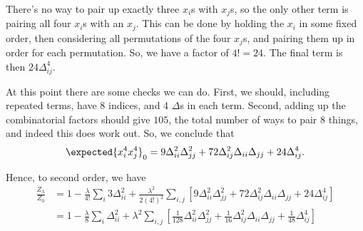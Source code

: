 \documentclass[fleqn]{NotesClass}
\begin{document}
    There's no way to pair up exactly three \(x_i\)s with \(x_j\)s, so the only other term is pairing all four \(x_i\)s with an \(x_j\).
    This can be done by holding the \(x_i\) in some fixed order, then considering all permutations of the four \(x_j\)s, and pairing them up in order for each permutation.
    So, we have a factor of \(4! = 24\).
    The final term is then \(24\Delta_{ij}^4\).
    
    At this point there are some checks we can do.
    First, we should, including repeated terms, have 8 indices, and 4 \(\Delta\)s in each term.
    Second, adding up the combinatorial factors should give \(105\), the total number of ways to pair 8 things, and indeed this does work out.
    So, we conclude that
    \begin{equation}
        \expected{x_i^4 x_j^4}_0 = 9\Delta_{ii}^2\Delta_{jj}^2 + 72\Delta_{ij}^2\Delta_{ii}\Delta_{jj} + 24\Delta_{ij}^4.
    \end{equation}
    
    Hence, to second order, we have
    \begin{align}
        \frac{Z_\lambda}{Z_0} &= 1 - \frac{\lambda}{4!} \sum_{i} 3\Delta_{ii}^2 + \frac{\lambda^2}{2 (4!)^2}\sum_{i,j}[9\Delta_{ii}^2\Delta_{jj}^2 + 72\Delta_{ij}^2\Delta_{ii}\Delta_{jj} + 24\Delta_{ij}^4]\\
        &= 1 - \frac{\lambda}{8} \sum_i \Delta_{ii}^2 + \lambda^2\sum_{i,j} \left[ \frac{1}{128}\Delta_{ii}^2\Delta_{jj}^2 + \frac{1}{16}\Delta_{ij}^2\Delta_{ii}\Delta_{jj} + \frac{1}{48}\Delta_{ij}^4 \right]
    \end{align}
    
\end{document}
